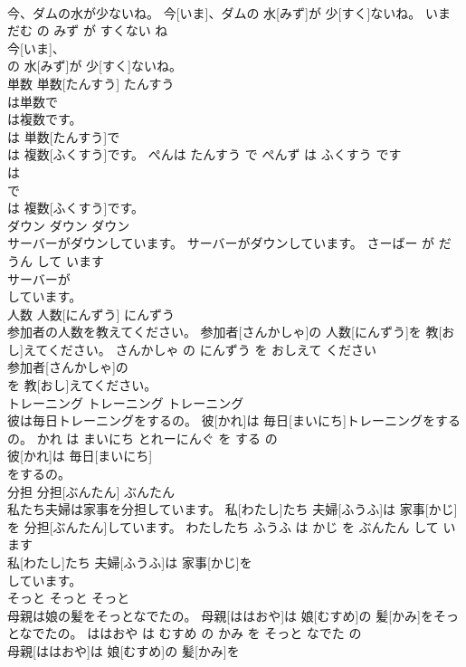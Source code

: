 \documentclass[8pt]{extreport}
\begin{document}
\begin{CJK}{UTF8}{min}
\\	今、ダムの水が少ないね。	今[いま]、ダムの 水[みず]が 少[すく]ないね。	いま だむ の みず が すくない ね	
\\	今[いま]、
\\	の 水[みず]が 少[すく]ないね。			
\\	単数	単数[たんすう]	たんすう	
\\	は単数で
\\	は複数です。	
\\	[ぺん]は 単数[たんすう]で 
\\	[ぺんず]は 複数[ふくすう]です。	ぺんは たんすう で ぺんず は ふくすう です	
\\	[ぺん]は
\\	で 
\\	[ぺんず]は 複数[ふくすう]です。			
\\	ダウン	ダウン	ダウン	
\\	サーバーがダウンしています。	サーバーがダウンしています。	さーばー が だうん して います	
\\	サーバーが
\\	しています。			
\\	人数	人数[にんずう]	にんずう	
\\	参加者の人数を教えてください。	参加者[さんかしゃ]の 人数[にんずう]を 教[おし]えてください。	さんかしゃ の にんずう を おしえて ください	
\\	参加者[さんかしゃ]の
\\	を 教[おし]えてください。			
\\	トレーニング	トレーニング	トレーニング	
\\	彼は毎日トレーニングをするの。	彼[かれ]は 毎日[まいにち]トレーニングをするの。	かれ は まいにち とれーにんぐ を する の	
\\	彼[かれ]は 毎日[まいにち]
\\	をするの。			
\\	分担	分担[ぶんたん]	ぶんたん	
\\	私たち夫婦は家事を分担しています。	私[わたし]たち 夫婦[ふうふ]は 家事[かじ]を 分担[ぶんたん]しています。	わたしたち ふうふ は かじ を ぶんたん して います	
\\	私[わたし]たち 夫婦[ふうふ]は 家事[かじ]を
\\	しています。			
\\	そっと	そっと	そっと	
\\	母親は娘の髪をそっとなでたの。	母親[ははおや]は 娘[むすめ]の 髪[かみ]をそっとなでたの。	ははおや は むすめ の かみ を そっと なでた の	
\\	母親[ははおや]は 娘[むすめ]の 髪[かみ]を

\end{CJK}
\end{document}
